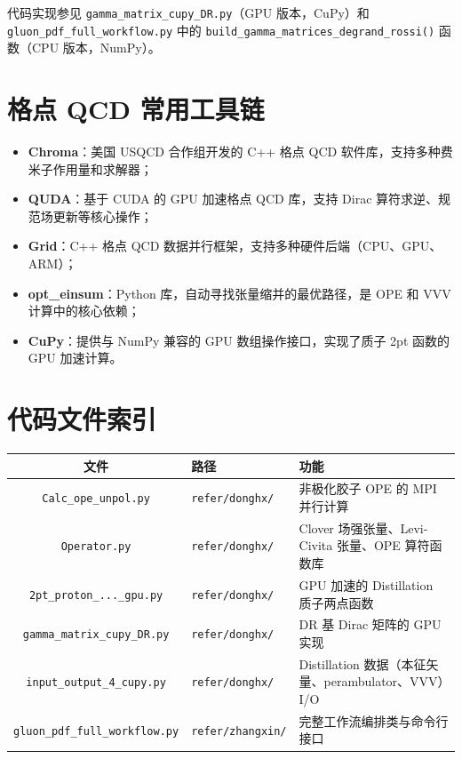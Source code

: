 \documentclass[11pt,a4paper]{ctexart}
\begin{document}
代码实现参见 \texttt{gamma\_matrix\_cupy\_DR.py}（GPU 版本，CuPy）和 \texttt{gluon\_pdf\_full\_workflow.py} 中的 \texttt{build\_gamma\_matrices\_degrand\_rossi()} 函数（CPU 版本，NumPy）。

\section{格点 QCD 常用工具链}

\begin{itemize}
  \item \textbf{Chroma}：美国 USQCD 合作组开发的 C++ 格点 QCD 软件库，支持多种费米子作用量和求解器；
  \item \textbf{QUDA}：基于 CUDA 的 GPU 加速格点 QCD 库，支持 Dirac 算符求逆、规范场更新等核心操作；
  \item \textbf{Grid}：C++ 格点 QCD 数据并行框架，支持多种硬件后端（CPU、GPU、ARM）；
  \item \textbf{opt\_einsum}：Python 库，自动寻找张量缩并的最优路径，是 OPE 和 VVV 计算中的核心依赖；
  \item \textbf{CuPy}：提供与 NumPy 兼容的 GPU 数组操作接口，实现了质子 2pt 函数的 GPU 加速计算。
\end{itemize}

\section{代码文件索引}

\begin{center}
\begin{tabular}{c l p{6cm}}
\toprule
\textbf{文件} & \textbf{路径} & \textbf{功能} \\
\midrule
\texttt{Calc\_ope\_unpol.py} & \texttt{refer/donghx/} & 非极化胶子 OPE 的 MPI 并行计算 \\
\texttt{Operator.py} & \texttt{refer/donghx/} & Clover 场强张量、Levi-Civita 张量、OPE 算符函数库 \\
\texttt{2pt\_proton\_...\_gpu.py} & \texttt{refer/donghx/} & GPU 加速的 Distillation 质子两点函数 \\
\texttt{gamma\_matrix\_cupy\_DR.py} & \texttt{refer/donghx/} & DR 基 Dirac 矩阵的 GPU 实现 \\
\texttt{input\_output\_4\_cupy.py} & \texttt{refer/donghx/} & Distillation 数据（本征矢量、perambulator、VVV）I/O \\
\texttt{gluon\_pdf\_full\_workflow.py} & \texttt{refer/zhangxin/} & 完整工作流编排类与命令行接口 \\
\bottomrule
\end{tabular}
\end{center}
\end{document}
